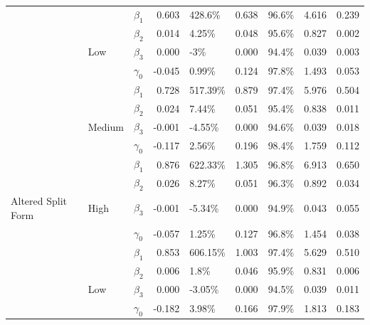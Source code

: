 \documentclass{svjour3}\usepackage[]{graphicx}\usepackage[]{color}
\newenvironment{knitrout}{}{} %
\begin{document}
\begin{knitrout}
\begin{table}[!h]
{\begin{tabular}[t]{l|l|l|r|l|r|l|r|r}
 &  & $\beta_1$ & 0.603 & 428.6\% & 0.638 & 96.6\% & 4.616 & 0.239\\

 &  & $\beta_2$ & 0.014 & 4.25\% & 0.048 & 95.6\% & 0.827 & 0.002\\

 & \multirow{-4}{*}{\raggedright\arraybackslash Low} & $\beta_3$ & 0.000 & -3\% & 0.000 & 94.4\% & 0.039 & 0.003\\

 &  & $\gamma_0$ & -0.045 & 0.99\% & 0.124 & 97.8\% & 1.493 & 0.053\\

 &  & $\beta_1$ & 0.728 & 517.39\% & 0.879 & 97.4\% & 5.976 & 0.504\\

 &  & $\beta_2$ & 0.024 & 7.44\% & 0.051 & 95.4\% & 0.838 & 0.011\\

 & \multirow{-4}{*}{\raggedright\arraybackslash Medium} & $\beta_3$ & -0.001 & -4.55\% & 0.000 & 94.6\% & 0.039 & 0.018\\

 &  & $\gamma_0$ & -0.117 & 2.56\% & 0.196 & 98.4\% & 1.759 & 0.112\\

 &  & $\beta_1$ & 0.876 & 622.33\% & 1.305 & 96.8\% & 6.913 & 0.650\\

 &  & $\beta_2$ & 0.026 & 8.27\% & 0.051 & 96.3\% & 0.892 & 0.034\\

\multirow{-12}{*}{\raggedright\arraybackslash Altered Split Form} & \multirow{-4}{*}{\raggedright\arraybackslash High} & $\beta_3$ & -0.001 & -5.34\% & 0.000 & 94.9\% & 0.043 & 0.055\\
\cline{1-9}
 &  & $\gamma_0$ & -0.057 & 1.25\% & 0.127 & 96.8\% & 1.454 & 0.038\\

 &  & $\beta_1$ & 0.853 & 606.15\% & 1.003 & 97.4\% & 5.629 & 0.510\\

 &  & $\beta_2$ & 0.006 & 1.8\% & 0.046 & 95.9\% & 0.831 & 0.006\\

 & \multirow{-4}{*}{\raggedright\arraybackslash Low} & $\beta_3$ & 0.000 & -3.05\% & 0.000 & 94.5\% & 0.039 & 0.011\\

 &  & $\gamma_0$ & -0.182 & 3.98\% & 0.166 & 97.9\% & 1.813 & 0.183\\


\end{tabular}}
\end{table}
\end{knitrout}
\end{document}
